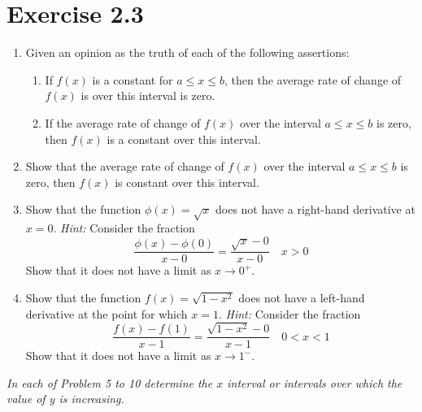 \documentclass{report}
\begin{document}
\section{Exercise 2.3}
\begin{enumerate}
      \item Given an opinion as the truth of each of the following assertions:
            \begin{enumerate}
                  \item If $f(x)$ is a constant for $a \leq x \leq b$, then the average rate of change
                        of $f(x)$ is over this interval is zero.
                  \item If the average rate of change of $f(x)$ over the interval $a \leq x \leq b$ is
                        zero, then $f(x)$ is a constant over this interval.
            \end{enumerate}
      \item Show that the average rate of change of $f(x)$ over the interval $a \leq x \leq
                  b$ is zero, then $f(x)$ is constant over this interval.
      \item Show that the function $\phi(x) = \sqrt{x}$ does not have a right-hand
            derivative at $x = 0$. \textit{Hint:} Consider the fraction \[\dfrac{\phi(x) - \phi(0)}{x - 0} = \dfrac{\sqrt{x} - 0}{x - 0} \quad x > 0\]
            Show that it does not have a limit as $x \to 0^{+}$.
      \item Show that the function $f(x) = \sqrt{1 - x^2}$ does not have a left-hand
            derivative at the point for which $x = 1$. \textit{Hint:} Consider the fraction \[\dfrac{f(x) - f(1)}{x - 1} = \dfrac{\sqrt{1 - x^2} - 0}{x - 1} \quad 0 < x < 1\]
            Show that it does not have a limit as $x \to 1^{-}$.
\end{enumerate}
\textit{In each of Problem 5 to 10 determine the $x$ interval or intervals over which the value of $y$ is increasing.}
\end{document}
